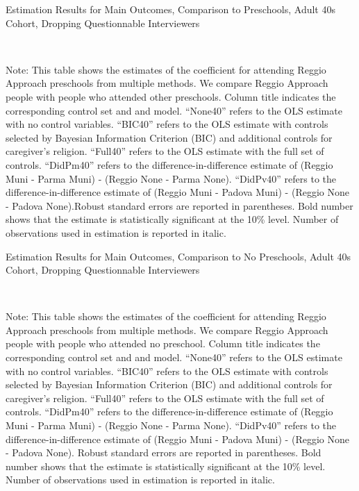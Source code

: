 \begin{table}[H] \caption{Estimation Results for Main Outcomes, Comparison to Preschools, Adult 40s Cohort, Dropping Questionnable Interviewers} \label{ols-M-adult40-reg-pres-dropint}
\scalebox{0.75}{}
\vspace{1ex} \\
\footnotesize\raggedright{Note: This table shows the estimates of the coefficient for attending Reggio Approach preschools from multiple methods. We compare Reggio Approach people with people who attended other preschools.  Column title indicates the corresponding control set and and model. ``None40'' refers to the OLS estimate with no control variables. ``BIC40'' refers to the OLS estimate with controls selected by Bayesian Information Criterion (BIC) and additional controls for caregiver's religion. ``Full40'' refers to the OLS estimate with the full set of controls. ``DidPm40'' refers to the difference-in-difference estimate of (Reggio Muni - Parma Muni) - (Reggio None - Parma None). ``DidPv40'' refers to the difference-in-difference estimate of (Reggio Muni - Padova Muni) - (Reggio None - Padova None).Robust standard errors are reported in parentheses. Bold number shows that the estimate is statistically significant at the 10\% level. Number of observations used in estimation is reported in italic.}
\end{table}

\begin{table}[H] \caption{Estimation Results for Main Outcomes, Comparison to No Preschools, Adult 40s Cohort, Dropping Questionnable Interviewers} \label{ols-M-adult40-reg-nopres-dropint}
\scalebox{0.75}{}
\vspace{1ex} \\
\footnotesize\raggedright{Note: This table shows the estimates of the coefficient for attending Reggio Approach preschools from multiple methods. We compare Reggio Approach people with people who attended no preschool. Column title indicates the corresponding control set and and model. ``None40'' refers to the OLS estimate with no control variables. ``BIC40'' refers to the OLS estimate with controls selected by Bayesian Information Criterion (BIC) and additional controls for caregiver's religion. ``Full40'' refers to the OLS estimate with the full set of controls. ``DidPm40'' refers to the difference-in-difference estimate of (Reggio Muni - Parma Muni) - (Reggio None - Parma None). ``DidPv40'' refers to the difference-in-difference estimate of (Reggio Muni - Padova Muni) - (Reggio None - Padova None). Robust standard errors are reported in parentheses. Bold number shows that the estimate is statistically significant at the 10\% level. Number of observations used in estimation is reported in italic.}
\end{table}





